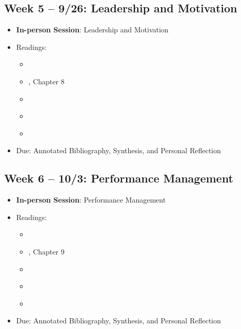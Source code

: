 \documentclass[12pt, letterpaper]{article}
\begin{document}
\subsection*{Week 5 -- 9/26: Leadership and Motivation}
\begin{itemize}
    \item \textbf{In-person Session}: Leadership and Motivation
    \item Readings:
    \begin{itemize}
        \item \cite{Christensen2017}
        \item \cite{Denhardt2015}, Chapter 8
        \item \cite{Lachance2017}
        \item \cite{Magee2014}
        \item \cite{Fairholm2004}
    \end{itemize}
    \item Due: Annotated Bibliography, Synthesis, and Personal Reflection
\end{itemize}

\subsection*{Week 6 -- 10/3: Performance Management}
\begin{itemize}
    \item \textbf{In-person Session}: Performance Management
    \item Readings:
    \begin{itemize}
        \item \cite{Behn2003}
        \item \cite{Denhardt2015}, Chapter 9
        \item \cite{douglas2021}
        \item \cite{marvel2015}
        \item \cite{nicholson-crotty2004}
    \end{itemize}
    \item Due: Annotated Bibliography, Synthesis, and Personal Reflection
\end{itemize}
\end{document}
